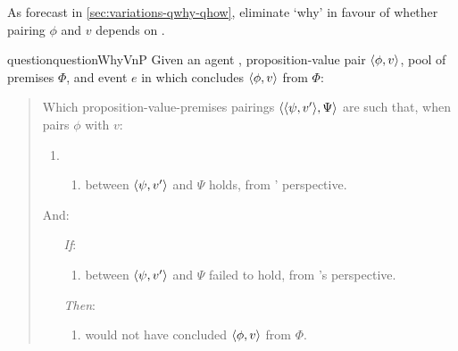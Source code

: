 \begin{note}
  As forecast in \autoref{sec:variations-qwhy-qhow}, eliminate `why' in favour of whether pairing \(\phi\) and \(v\) depends on \ros{}.

  \begin{restatable}[\qWhyVnP{}]{question}{questionWhyVnP}
    \label{q:why:v:nP}
    Given an agent \vAgent{}, proposition-value pair \(\langle \phi, v \rangle\), pool of premises \(\Phi\), and event \(e\) in which \vAgent{} concludes \(\langle \phi, v \rangle\) from \(\Phi\):

    \begin{quote}
      Which proposition-value-premises pairings \(\langle \langle \psi, v' \rangle, \Psi \rangle\) are such that, when \vAgent{} pairs \(\phi\) with \(v\):

      \begin{enumerate}[label=]
      \item
        \begin{enumerate}[label=\alph*., ref=(\alph*), series=qWhyVnPdef]
        \item
          \label{q:why:v:a}
           between \(\langle \psi, v' \rangle\) and \(\Psi\) holds, from \vAgent{}' perspective.
        \end{enumerate}
      \end{enumerate}

      And:

      \begin{enumerate}
      \item[\emph{If}:]
        \begin{enumerate}[label=\alph*., ref=(\alph*), resume*=qWhyVnPdef]
        \item
          \label{q:why:v:if}
           between \(\langle \psi, v' \rangle\) and \(\Psi\) failed to hold, from \vAgent{}'s perspective.
        \end{enumerate}
      \item[\emph{Then}:]
        \begin{enumerate}[label=\alph*., ref=(\alph*), resume*=qWhyVnPdef]
        \item
          \label{q:why:v:then}
          \vAgent{} would not have concluded \(\langle \phi, v \rangle\) from \(\Phi\).
        \end{enumerate}
      \end{enumerate}
    \end{quote}
    \vspace{-\baselineskip}
  \end{restatable}


\end{note}

